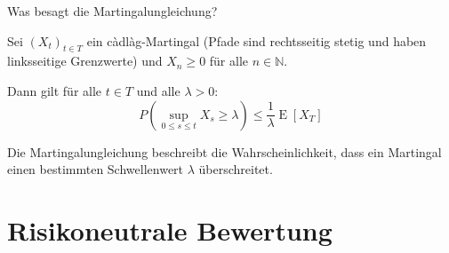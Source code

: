 \begin{QandA}
    \item Was besagt die Martingalungleichung?
    \begin{answered}
        Sei $(X_{t})_{t\in T}$ ein càdlàg-Martingal (Pfade sind rechtsseitig stetig und haben linksseitige Grenzwerte) und $X_n \geq 0$ für alle $n \in \mathbb{N}$.

        Dann gilt für alle $t \in T$ und alle $\lambda > 0$:
        \[
            P\left(\sup_{0 \leq s \leq t} X_s \geq \lambda\right) \leq \frac{1}{\lambda} \operatorname{E}[X_T]
        \]

        Die Martingalungleichung beschreibt die Wahrscheinlichkeit, dass ein Martingal einen bestimmten Schwellenwert $\lambda$ überschreitet.
    \end{answered}
\end{QandA}

\newpage
\section*{Risikoneutrale Bewertung}

